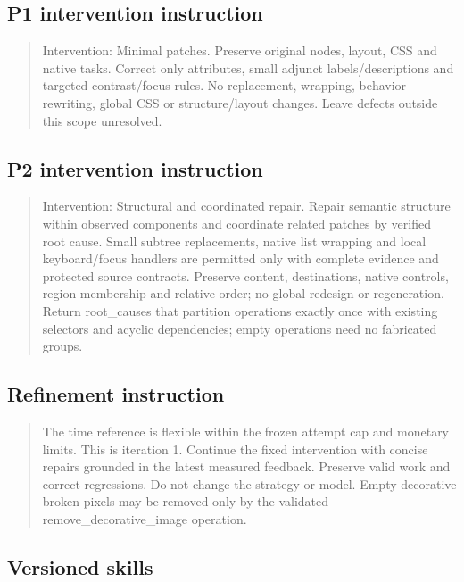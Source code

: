 \documentclass[acmsmall,screen,nonacm]{acmart}
\begin{document}
\subsection{P1 intervention instruction}

\begin{quote}\footnotesize\ttfamily\raggedright\sloppy Intervention: Minimal patches. Preserve original nodes, layout, CSS and native tasks. Correct only attributes, small adjunct labels/descriptions and targeted contrast/focus rules. No replacement, wrapping, behavior rewriting, global CSS or structure/layout changes. Leave defects outside this scope unresolved.\end{quote}

\subsection{P2 intervention instruction}

\begin{quote}\footnotesize\ttfamily\raggedright\sloppy Intervention: Structural and coordinated repair. Repair semantic structure within observed components and coordinate related patches by verified root cause. Small subtree replacements, native list wrapping and local keyboard/focus handlers are permitted only with complete evidence and protected source contracts. Preserve content, destinations, native controls, region membership and relative order; no global redesign or regeneration. Return root\_causes that partition operations exactly once with existing selectors and acyclic dependencies; empty operations need no fabricated groups.\end{quote}

\subsection{Refinement instruction}

\begin{quote}\footnotesize\ttfamily\raggedright\sloppy The time reference is flexible within the frozen attempt cap and monetary limits. This is iteration 1. Continue the fixed intervention with concise repairs grounded in the latest measured feedback. Preserve valid work and correct regressions. Do not change the strategy or model. Empty decorative broken pixels may be removed only by the validated remove\_decorative\_image operation.\end{quote}

\subsection{Versioned skills}
\end{document}
